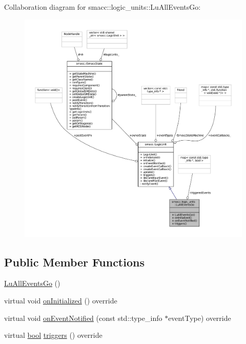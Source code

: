 Collaboration diagram for smacc\+:\+:logic\+\_\+units\+:\+:Lu\+All\+Events\+Go\+:
\nopagebreak
\begin{figure}[H]
\begin{center}
\leavevmode
\includegraphics[width=350pt]{classsmacc_1_1logic__units_1_1LuAllEventsGo__coll__graph}
\end{center}
\end{figure}
\subsection*{Public Member Functions}
\begin{DoxyCompactItemize}
\item 
\hyperlink{classsmacc_1_1logic__units_1_1LuAllEventsGo_ab6d024be6f7fad2546f24712e0e100e8}{Lu\+All\+Events\+Go} ()
\item 
virtual void \hyperlink{classsmacc_1_1logic__units_1_1LuAllEventsGo_a01229bb4935f6ebe895b3aeadc187db7}{on\+Initialized} () override
\item 
virtual void \hyperlink{classsmacc_1_1logic__units_1_1LuAllEventsGo_a6c32f39649fabcc01742ca7dcb76acf8}{on\+Event\+Notified} (const std\+::type\+\_\+info $\ast$event\+Type) override
\item 
virtual \hyperlink{classbool}{bool} \hyperlink{classsmacc_1_1logic__units_1_1LuAllEventsGo_a89a25635e1ebb192433267fdbd0530b8}{triggers} () override
\end{DoxyCompactItemize}
